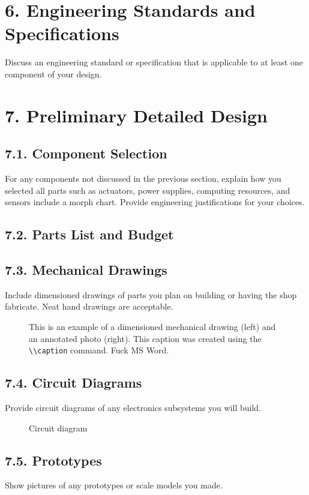 \documentclass[10pt]{article}
\begin{document}
\section{6. Engineering Standards and Specifications}
Discuss an engineering standard or specification that is applicable to at least one component of your design.

\section{7. Preliminary Detailed Design}
\subsection{7.1. Component Selection}
For any components not discussed in the previous section, explain how you selected all parts such as actuators, power supplies, computing resources, and sensors include a morph chart.  Provide engineering justifications for your choices.
 
\subsection{7.2. Parts List and Budget}

\subsection{7.3. Mechanical Drawings}
Include dimensioned drawings of parts you plan on building or having the shop fabricate.   Neat hand drawings are acceptable. 
\begin{figure}
\caption{This is an example of a dimensioned mechanical drawing (left) and an annotated photo (right).  This caption was created using the \lstinline{\\caption} command. Fuck MS Word.}
\label{fig:1}
\end{figure}

\subsection{7.4. Circuit Diagrams}
Provide circuit diagrams of any electronics subsystems you will build.
\begin{figure}
\caption{Circuit diagram}
\label{fig:2}
\end{figure}

\subsection{7.5. Prototypes}
Show pictures of any prototypes or scale models you made.
\end{document}
